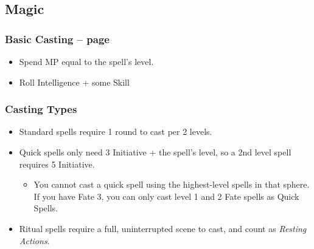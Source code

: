 \begin{multicols}{2}
\begin{itemize}
\end{itemize}

\subsection{Magic}

\subsubsection{Basic Casting -- page \pageref{basiccasting}}

\begin{itemize}

	\item{Spend MP equal to the spell's level.}
	\item{Roll Intelligence + some Skill}

\end{itemize}

\subsubsection{Casting Types}

\begin{itemize}

	\item{Standard spells require 1 round to cast per 2 levels.}
	\item{Quick spells only need 3 Initiative + the spell's level, so a 2nd level spell requires 5 Initiative.}
	\begin{itemize}
		\item{You cannot cast a quick spell using the highest-level spells in that sphere.  If you have Fate 3, you can only cast level 1 and 2 Fate spells as Quick Spells.}
	\end{itemize}
	\item{Ritual spells require a full, uninterrupted scene to cast, and count as \textit{Resting Actions}.}

\end{itemize}

\end{multicols}
